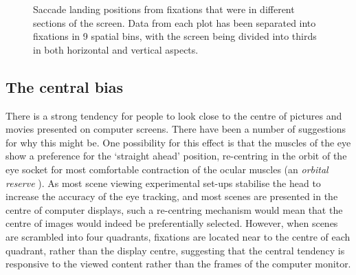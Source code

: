 \documentclass[a4paper, twocolumn, oneside, 10pt]{article}
\begin{document}
\begin{figure}[htb]
\caption{Saccade landing positions from fixations that were in different sections of the screen. Data from each plot has been separated into fixations in 9 spatial bins, with the screen being divided into thirds in both horizontal and vertical aspects.}
\label{fig:empiricalSaccadicFlow}
\end{figure}


\subsection{The central bias}
There is a strong tendency for people to look close to the centre of pictures \citep{Tatler:2007hk,Tatler:2005bw, Canosa:2003tu, clarke_tatler2014} and movies \citep{Tseng:2009jn} presented on computer screens. There have been a number of suggestions for why this might be. One possibility for this effect is that the muscles of the eye show a preference for the `straight ahead' position, re-centring in the orbit of the eye socket for most comfortable contraction of the ocular muscles (an \emph{orbital reserve} \citep{Fuller:1996bx}). As most scene viewing experimental set-ups stabilise the head to increase the accuracy of the eye tracking, and most scenes are presented in the centre of computer displays, such a re-centring mechanism would mean that the centre of images would indeed be preferentially selected. However, when scenes are scrambled into four quadrants, fixations are located near to the centre of each quadrant, rather than the display centre, suggesting that the central tendency is responsive to the viewed content \citep{Stainer:2013ce} rather than the frames of the computer monitor.
\end{document}
